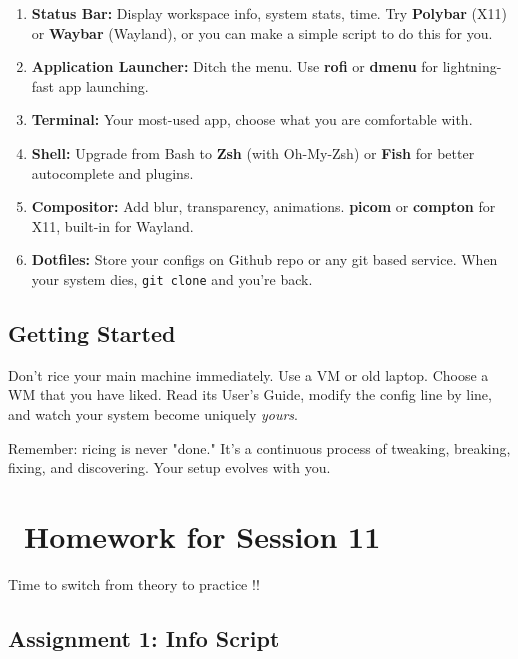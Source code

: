 \documentclass[12pt]{article}
\newcommand{\homeworkicon}{\faPencilAlt}
\begin{document}
\begin{enumerate}
    \item \textbf{Status Bar:} Display workspace info, system stats, time. Try \textbf{Polybar} (X11) or \textbf{Waybar} (Wayland), or you can make a simple script to do this for you.
    
    \item \textbf{Application Launcher:} Ditch the menu. Use \textbf{rofi} or \textbf{dmenu} for lightning-fast app launching.
    
    \item \textbf{Terminal:} Your most-used app, choose what you are comfortable with.
    
    \item \textbf{Shell:} Upgrade from Bash to \textbf{Zsh} (with Oh-My-Zsh) or \textbf{Fish} for better autocomplete and plugins.
    
    \item \textbf{Compositor:} Add blur, transparency, animations. \textbf{picom} or \textbf{compton} for X11, built-in for Wayland.
    
    \item \textbf{Dotfiles:} Store your configs on Github repo or any git based service. When your system dies, \texttt{git clone} and you're back.
\end{enumerate}

\subsection*{Getting Started}

Don't rice your main machine immediately. Use a VM or old laptop. Choose a WM that you have liked. Read its User's Guide, modify the config line by line, and watch your system become uniquely \textit{yours}.

\begin{infobox}
Remember: ricing is never "done." It's a continuous process of tweaking, breaking, fixing, and discovering. Your setup evolves with you.
\end{infobox}

\section*{\homeworkicon\ Homework for Session 11}

Time to switch from theory to practice !!

\subsection*{Assignment 1: Info Script}
\end{document}
